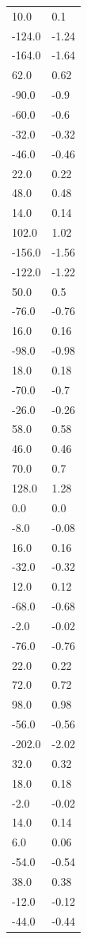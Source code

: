 \begin{longtable}{ll}
10.0 & 0.1 \\
-124.0 & -1.24 \\
-164.0 & -1.64 \\
62.0 & 0.62 \\
-90.0 & -0.9 \\
-60.0 & -0.6 \\
-32.0 & -0.32 \\
-46.0 & -0.46 \\
22.0 & 0.22 \\
48.0 & 0.48 \\
14.0 & 0.14 \\
102.0 & 1.02 \\
-156.0 & -1.56 \\
-122.0 & -1.22 \\
50.0 & 0.5 \\
-76.0 & -0.76 \\
16.0 & 0.16 \\
-98.0 & -0.98 \\
18.0 & 0.18 \\
-70.0 & -0.7 \\
-26.0 & -0.26 \\
58.0 & 0.58 \\
46.0 & 0.46 \\
70.0 & 0.7 \\
128.0 & 1.28 \\
0.0 & 0.0 \\
-8.0 & -0.08 \\
16.0 & 0.16 \\
-32.0 & -0.32 \\
12.0 & 0.12 \\
-68.0 & -0.68 \\
-2.0 & -0.02 \\
-76.0 & -0.76 \\
22.0 & 0.22 \\
72.0 & 0.72 \\
98.0 & 0.98 \\
-56.0 & -0.56 \\
-202.0 & -2.02 \\
32.0 & 0.32 \\
18.0 & 0.18 \\
-2.0 & -0.02 \\
14.0 & 0.14 \\
6.0 & 0.06 \\
-54.0 & -0.54 \\
38.0 & 0.38 \\
-12.0 & -0.12 \\
-44.0 & -0.44 \\

\end{longtable}
